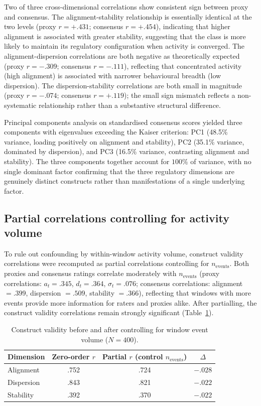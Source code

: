 \documentclass[preprint,12pt,authoryear]{elsarticle}
\begin{document}
Two of three cross-dimensional correlations show consistent sign between proxy and consensus. The alignment-stability relationship is essentially identical at the two levels (proxy $r = +.431$; consensus $r = +.454$), indicating that higher alignment is associated with greater stability, suggesting that the class is more likely to maintain its regulatory configuration when activity is converged. The alignment-dispersion correlations are both negative as theoretically expected (proxy $r = -.309$; consensus $r = -.111$), reflecting that concentrated activity (high alignment) is associated with narrower behavioural breadth (low dispersion). The dispersion-stability correlations are both small in magnitude (proxy $r = -.074$; consensus $r = +.119$); the small sign mismatch reflects a non-systematic relationship rather than a substantive structural difference.

Principal components analysis on standardised consensus scores yielded three components with eigenvalues exceeding the Kaiser criterion: PC1 (48.5\% variance, loading positively on alignment and stability), PC2 (35.1\% variance, dominated by dispersion), and PC3 (16.5\% variance, contrasting alignment and stability). The three components together account for $100\%$ of variance, with no single dominant factor confirming that the three regulatory dimensions are genuinely distinct constructs rather than manifestations of a single underlying factor.

\subsection{Partial correlations controlling for activity volume}
\label{sec:results-partial}

To rule out confounding by within-window activity volume, construct validity correlations were recomputed as partial correlations controlling for $n_{\mathrm{events}}$. Both proxies and consensus ratings correlate moderately with $n_{\mathrm{events}}$ (proxy correlations: $a_t = .345$, $d_t = .364$, $\sigma_t = .076$; consensus correlations: alignment $= .399$, dispersion $= .509$, stability $= .366$), reflecting that windows with more events provide more information for raters and proxies alike. After partialling, the construct validity correlations remain strongly significant (Table~\ref{tab:partial}).

\begin{table}[h]
\centering
\caption{Construct validity before and after controlling for window event volume ($N = 400$).}
\label{tab:partial}
\begin{tabular}{lccc}
\hline
Dimension & Zero-order $r$ & Partial $r$ (control $n_{\mathrm{events}}$) & $\Delta$ \\
\hline
Alignment & .752 & .724 & $-.028$ \\
Dispersion & .843 & .821 & $-.022$ \\
Stability & .392 & .370 & $-.022$ \\
\hline
\end{tabular}
\end{table}
\end{document}
